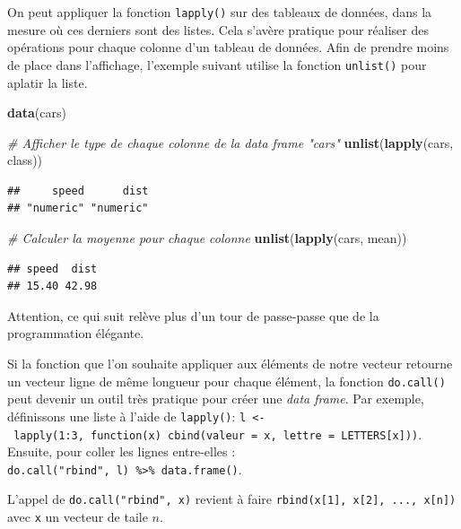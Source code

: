 \documentclass[
  11pt,
]{book}
\newenvironment{Shaded}{\begin{snugshade}}{\end{snugshade}}
\newcommand{\CommentTok}[1]{\textcolor[rgb]{0.56,0.35,0.01}{\textit{#1}}}
\newcommand{\KeywordTok}[1]{\textcolor[rgb]{0.13,0.29,0.53}{\textbf{#1}}}
\newcommand{\NormalTok}[1]{#1}
\numberwithin{equation}{section}
\newcounter{countremarque}
\newenvironment{remarque}{%
 \refstepcounter{countremarque}
    \begin{tcolorbox}[width=\linewidth, colback=blue!3, boxrule=0.5pt,arc=0pt,title = Remarque \thecountremarque]
    }%
    {
    \end{tcolorbox}
    }
\numberwithin{countremarque}{section}
\begin{document}
On peut appliquer la fonction \texttt{lapply()} sur des tableaux de données, dans la mesure où ces derniers sont des listes. Cela s'avère pratique pour réaliser des opérations pour chaque colonne d'un tableau de données. Afin de prendre moins de place dans l'affichage, l'exemple suivant utilise la fonction \texttt{unlist()} pour aplatir la liste.

\begin{Shaded}
\begin{Highlighting}[]
\KeywordTok{data}\NormalTok{(cars)}

\CommentTok{\# Afficher le type de chaque colonne de la data frame "cars"}
\KeywordTok{unlist}\NormalTok{(}\KeywordTok{lapply}\NormalTok{(cars, class))}
\end{Highlighting}
\end{Shaded}

\begin{lstlisting}
##     speed      dist 
## "numeric" "numeric"
\end{lstlisting}

\begin{Shaded}
\begin{Highlighting}[]
\CommentTok{\# Calculer la moyenne pour chaque colonne}
\KeywordTok{unlist}\NormalTok{(}\KeywordTok{lapply}\NormalTok{(cars, mean))}
\end{Highlighting}
\end{Shaded}

\begin{lstlisting}
## speed  dist 
## 15.40 42.98
\end{lstlisting}

\begin{remarque}
Attention, ce qui suit relève plus d'un tour de passe-passe que de la programmation élégante.

Si la fonction que l'on souhaite appliquer aux éléments de notre vecteur retourne un vecteur ligne de même longueur pour chaque élément, la fonction \texttt{do.call()} peut devenir un outil très pratique pour créer une \emph{data frame}. Par exemple, définissons une liste à l'aide de \texttt{lapply()}: \texttt{l\ \textless{}-\ lapply(1:3,\ function(x)\ cbind(valeur\ =\ x,\ lettre\ =\ LETTERS{[}x{]}))}. Ensuite, pour coller les lignes entre-elles : \texttt{do.call("rbind",\ l)\ \%\textgreater{}\%\ data.frame()}.

L'appel de \texttt{do.call("rbind",\ x)} revient à faire \texttt{rbind(x{[}1{]},\ x{[}2{]},\ ...,\ x{[}n{]})} avec \texttt{x} un vecteur de taile \(n\).
\end{remarque}
\end{document}
